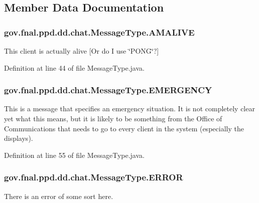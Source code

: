 \subsection{Member Data Documentation}
\hypertarget{enumgov_1_1fnal_1_1ppd_1_1dd_1_1chat_1_1MessageType_aed446af88466c871fc01970edcaf84dd}{
\subsubsection[{A\-M\-A\-L\-I\-V\-E}]{\setlength{\rightskip}{0pt plus 5cm}gov.\-fnal.\-ppd.\-dd.\-chat.\-Message\-Type.\-A\-M\-A\-L\-I\-V\-E}}\label{enumgov_1_1fnal_1_1ppd_1_1dd_1_1chat_1_1MessageType_aed446af88466c871fc01970edcaf84dd}
This client is actually alive \mbox{[}Or do I use \char`\"{}\-P\-O\-N\-G\char`\"{}?\mbox{]} 

Definition at line 44 of file Message\-Type.\-java.

\hypertarget{enumgov_1_1fnal_1_1ppd_1_1dd_1_1chat_1_1MessageType_a8d59ce28c421afbc1ef0172b13f8b2eb}{
\subsubsection[{E\-M\-E\-R\-G\-E\-N\-C\-Y}]{\setlength{\rightskip}{0pt plus 5cm}gov.\-fnal.\-ppd.\-dd.\-chat.\-Message\-Type.\-E\-M\-E\-R\-G\-E\-N\-C\-Y}}\label{enumgov_1_1fnal_1_1ppd_1_1dd_1_1chat_1_1MessageType_a8d59ce28c421afbc1ef0172b13f8b2eb}
This is a message that specifies an emergency situation. It is not completely clear yet what this means, but it is likely to be something from the Office of Communications that needs to go to every client in the system (especially the displays). 

Definition at line 55 of file Message\-Type.\-java.

\hypertarget{enumgov_1_1fnal_1_1ppd_1_1dd_1_1chat_1_1MessageType_ad16db5c68a6e9d71810ee9662e9dcf73}{
\subsubsection[{E\-R\-R\-O\-R}]{\setlength{\rightskip}{0pt plus 5cm}gov.\-fnal.\-ppd.\-dd.\-chat.\-Message\-Type.\-E\-R\-R\-O\-R}}\label{enumgov_1_1fnal_1_1ppd_1_1dd_1_1chat_1_1MessageType_ad16db5c68a6e9d71810ee9662e9dcf73}
There is an error of some sort here. 

